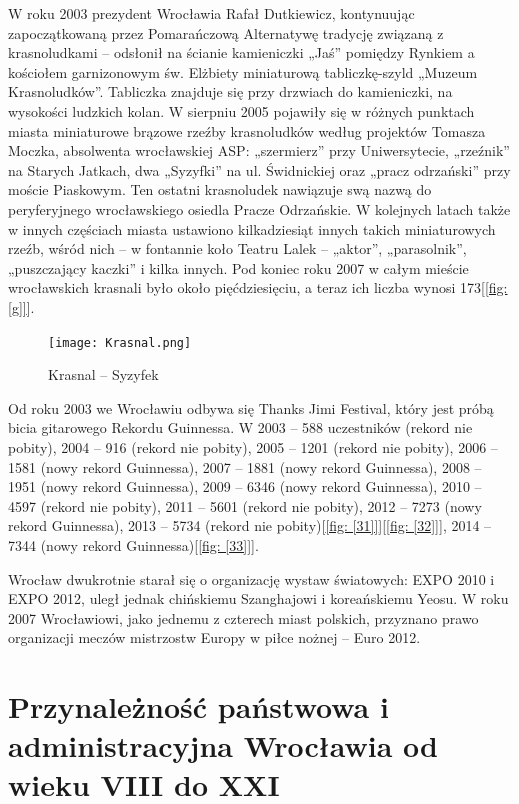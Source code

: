 \documentclass{article}
\begin{document}
W roku 2003 prezydent Wrocławia Rafał Dutkiewicz, kontynuując zapoczątkowaną przez Pomarańczową Alternatywę tradycję związaną z krasnoludkami – odsłonił na ścianie kamieniczki „Jaś” pomiędzy Rynkiem a kościołem garnizonowym św. Elżbiety miniaturową tabliczkę-szyld „Muzeum Krasnoludków”. Tabliczka znajduje się przy drzwiach do kamieniczki, na wysokości ludzkich kolan. W sierpniu 2005 pojawiły się w różnych punktach miasta miniaturowe brązowe rzeźby krasnoludków według projektów Tomasza Moczka, absolwenta wrocławskiej ASP: „szermierz” przy Uniwersytecie, „rzeźnik” na Starych Jatkach, dwa „Syzyfki” na ul. Świdnickiej oraz „pracz odrzański” przy moście Piaskowym. Ten ostatni krasnoludek nawiązuje swą nazwą do peryferyjnego wrocławskiego osiedla Pracze Odrzańskie. W kolejnych latach także w innych częściach miasta ustawiono kilkadziesiąt innych takich miniaturowych rzeźb, wśród nich – w fontannie koło Teatru Lalek – „aktor”, „parasolnik”, „puszczający kaczki” i kilka innych. Pod koniec roku 2007 w całym mieście wrocławskich krasnali było około pięćdziesięciu, a teraz ich liczba wynosi 173[\ref{fig: [g]}].

\begin{center}
\begin{figure}[h]
	\centering
	\texttt{[image: Krasnal.png]}
	\caption{Krasnal – Syzyfek}
\end{figure}
\end{center}


Od roku 2003 we Wrocławiu odbywa się Thanks Jimi Festival, który jest próbą bicia gitarowego Rekordu Guinnessa. W 2003 – 588 uczestników (rekord nie pobity), 2004 – 916 (rekord nie pobity), 2005 – 1201 (rekord nie pobity), 2006 – 1581 (nowy rekord Guinnessa), 2007 – 1881 (nowy rekord Guinnessa), 2008 – 1951 (nowy rekord Guinnessa), 2009 – 6346 (nowy rekord Guinnessa), 2010 – 4597 (rekord nie pobity), 2011 – 5601 (rekord nie pobity), 2012 – 7273 (nowy rekord Guinnessa), 2013 – 5734 (rekord nie pobity)[\ref{fig: [31]}][\ref{fig: [32]}], 2014 – 7344 (nowy rekord Guinnessa)[\ref{fig: [33]}].

Wrocław dwukrotnie starał się o organizację wystaw światowych: EXPO 2010 i EXPO 2012, uległ jednak chińskiemu Szanghajowi i koreańskiemu Yeosu. W roku 2007 Wrocławiowi, jako jednemu z czterech miast polskich, przyznano prawo organizacji meczów mistrzostw Europy w piłce nożnej – Euro 2012.

\clearpage
\section {Przynależność państwowa i administracyjna Wrocławia od wieku VIII do XXI}
\end{document}
